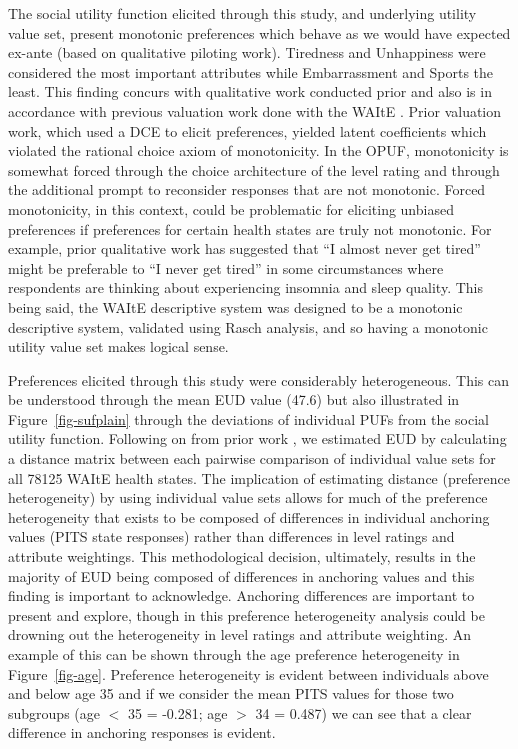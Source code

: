 \documentclass[
  number,
  preprint]{elsarticle}
\begin{document}
The social utility function elicited through this study, and underlying
utility value set, present monotonic preferences which behave as we
would have expected ex-ante (based on qualitative piloting work).
Tiredness and Unhappiness were considered the most important attributes
while Embarrassment and Sports the least. This finding concurs with
qualitative work conducted prior and also is in accordance with previous
valuation work done with the WAItE \citep{Robinson2024AUKValue}. Prior
valuation work, which used a DCE to elicit preferences, yielded latent
coefficients which violated the rational choice axiom of monotonicity.
In the OPUF, monotonicity is somewhat forced through the choice
architecture of the level rating and through the additional prompt to
reconsider responses that are not monotonic. Forced monotonicity, in
this context, could be problematic for eliciting unbiased preferences if
preferences for certain health states are truly not monotonic. For
example, prior qualitative work has suggested that ``I almost never get
tired'' might be preferable to ``I never get tired'' in some
circumstances where respondents are thinking about experiencing insomnia
and sleep quality. This being said, the WAItE descriptive system was
designed to be a monotonic descriptive system, validated using Rasch
analysis, and so having a monotonic utility value set makes logical
sense.

Preferences elicited through this study were considerably heterogeneous.
This can be understood through the mean EUD value (47.6) but also
illustrated in Figure~\ref{fig-sufplain} through the deviations of
individual PUFs from the social utility function. Following on from
prior work \citep{Schneider2024ExploringLevel}, we estimated EUD by
calculating a distance matrix between each pairwise comparison of
individual value sets for all 78125 WAItE health states. The implication
of estimating distance (preference heterogeneity) by using individual
value sets allows for much of the preference heterogeneity that exists
to be composed of differences in individual anchoring values (PITS state
responses) rather than differences in level ratings and attribute
weightings. This methodological decision, ultimately, results in the
majority of EUD being composed of differences in anchoring values and
this finding is important to acknowledge. Anchoring differences are
important to present and explore, though in this preference
heterogeneity analysis could be drowning out the heterogeneity in level
ratings and attribute weighting. An example of this can be shown through
the age preference heterogeneity in Figure~\ref{fig-age}. Preference
heterogeneity is evident between individuals above and below age 35 and
if we consider the mean PITS values for those two subgroups (age \(<\)
35 = -0.281; age \(>\) 34 = 0.487) we can see that a clear difference in
anchoring responses is evident.
\end{document}
